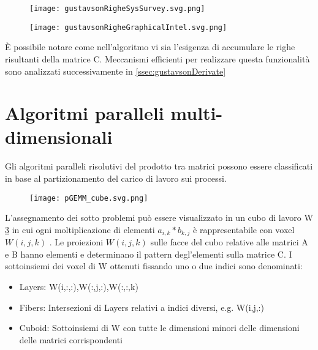 \begin{figure}[h]
  \caption[pseudo-codice dell'algoritmo di Gustavson]
  \centering \texttt{[image: gustavsonRigheSysSurvey.svg.png]} \decoRule
  \label{figCode:gustavsonRigheSysSurvey}
\end{figure}
\begin{figure}[h]
  \caption[rappresentazione grafica di una iterazione dell'algoritmo di Gustavson]
  \centering \texttt{[image: gustavsonRigheGraphicalIntel.svg.png]} \decoRule
  \label{fig:gustavsonRigheGraphicalIntel}
\end{figure}
È possibile notare come nell'algoritmo vi sia l'esigenza di accumulare le righe
risultanti della matrice C. Meccanismi efficienti per realizzare questa
funzionalità sono analizzati successivamente in \ref{ssec:gustavsonDerivate} %
\\


\section{Algoritmi paralleli multi-dimensionali}
Gli algoritmi paralleli risolutivi del prodotto tra matrici possono essere
classificati in base al partizionamento del carico di lavoro sui processi.\\
\begin{figure}[h]
  \centering \texttt{[image: pGEMM\_cube.svg.png]} 
  \caption[Rappresentazione grafica dell'assegnamento dei task per la risoluzione
      di SpGEMM in 1,2 e 3 dimensioni]\decoRule \label{fig:pGEMM_cube}
\end{figure}
L'assegnamento dei sotto problemi può essere visualizzato in un cubo di lavoro W \ref{fig:pGEMM_cube}
in cui ogni moltiplicazione di elementi \nnz $a_{i,k}*b_{k,j}$ è rappresentabile
con voxel $W(i,j,k)$ \parencite{cartesianPartitioningModels}.
Le proiezioni $W(i,j,k)$  sulle facce del cubo relative alle matrici A e B 
hanno elementi \nnz e determinano il pattern degl'elementi \nnz sulla matrice C.
I sottoinsiemi dei voxel di W ottenuti fissando uno o due indici sono denominati:
\begin{itemize}
  \item Layers: W(i,:,:),W(:,j,:),W(:,:,k)
  \item Fibers: Intersezioni di Layers relativi a indici diversi, e.g. W(i,j,:)
  \item Cuboid: Sottoinsiemi di W con tutte le dimensioni minori delle 
   dimensioni delle matrici corrispondenti
\end{itemize}

